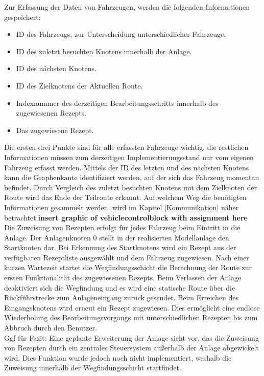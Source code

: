 			Zur Erfassung der Daten von Fahrzeugen, werden die folgenden Informationen gespeichert:
			
			\begin{itemize}
				\item ID des Fahrzeugs, zur Unterscheidung unterschiedlicher Fahrzeuge.
				\item ID des zuletzt besuchten Knotens innerhalb der Anlage.
				\item ID des nächsten Knotens. 
				\item ID des Zielknotens der Aktuellen Route.
				\item Indexnummer des derzeitigen Bearbeitungsschritts innerhalb des zugewiesenen Rezepts.
				\item Das zugewiesene Rezept.
			\end{itemize} 
			
			Die ersten drei Punkte sind für alle erfassten Fahrzeuge wichtig, die restlichen Informationen müssen zum derzeitigen Implementierungsstand nur vom eigenen Fahrzeug erfasst werden. Mittels der ID des letzten und des nächsten Knotens kann die Graphenkante identifiziert werden, auf der sich das Fahrzeug momentan befindet. Durch Vergleich des zuletzt besuchten Knotens mit dem Zielknoten der Route wird das Ende der Teilroute erkannt. Auf welchem Weg die benötigten Informationen gesammelt werden, wird im  Kapitel \ref{Kommunikation} näher betrachtet.\textbf{insert graphic of vehiclecontrolblock with assignment here}\\
			
			Die Zuweisung von Rezepten erfolgt für jedes Fahrzeug beim Eintritt in die Anlage. Der Anlagenknoten 0 stellt in der realisierten Modellanlage den Startknoten dar. Bei Erkennung des Startknotens wird ein Rezept aus der verfügbaren Rezeptliste ausgewählt und dem Fahrzeug zugewiesen. Nach einer kurzen Wartezeit startet die Wegfindungsschicht die Berechnung der Route zur ersten Funktionalität des zugewiesenen Rezepts. Beim Verlassen der Anlage deaktiviert sich die Wegfindung und es wird eine statische Route über die Rückführstrecke zum Anlageneingang zurück gesendet. Beim Erreichen des Eingangsknotens wird erneut ein Rezept zugewiesen. Dies ermöglicht eine endlose Wiederholung des Bearbeitungsvorgangs  mit unterschiedlichen Rezepten bis zum Abbruch durch den Benutzer.\\
			
			Ggf für Fazit: Eine geplante Erweiterung der Anlage sieht vor, das die Zuweisung von Rezepten durch ein zentrales Steuersystem außerhalb der Anlage abgewickelt wird. Dies Funktion wurde jedoch noch nicht implementiert, weshalb die Zuweisung innerhalb der Wegfindungsschicht stattfindet.
			
